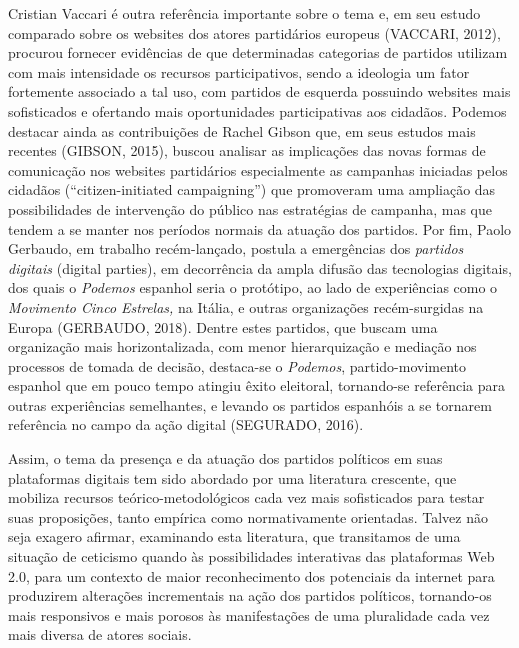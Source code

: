 Cristian Vaccari é outra referência importante sobre o tema e, em seu
estudo comparado sobre os websites dos atores partidários europeus
(VACCARI, 2012), procurou fornecer evidências de que determinadas
categorias de partidos utilizam com mais intensidade os recursos
participativos, sendo a ideologia um fator fortemente associado a tal
uso, com partidos de esquerda possuindo websites mais sofisticados e
ofertando mais oportunidades participativas aos cidadãos. Podemos
destacar ainda as contribuições de Rachel Gibson que, em seus estudos
mais recentes (GIBSON, 2015), buscou analisar as implicações das novas
formas de comunicação nos websites partidários especialmente as
campanhas iniciadas pelos cidadãos (``citizen-initiated campaigning'')
que promoveram uma ampliação das possibilidades de intervenção do
público nas estratégias de campanha, mas que tendem a se manter nos
períodos normais da atuação dos partidos. Por fim, Paolo Gerbaudo, em
trabalho recém-lançado, postula a emergências dos \emph{partidos
digitais} (digital parties), em decorrência da ampla difusão das
tecnologias digitais, dos quais o \emph{Podemos} espanhol seria o
protótipo, ao lado de experiências como o \emph{Movimento Cinco
Estrelas,} na Itália, e outras organizações recém-surgidas na Europa
(GERBAUDO, 2018). Dentre estes partidos, que buscam uma organização mais
horizontalizada, com menor hierarquização e mediação nos processos de
tomada de decisão, destaca-se o \emph{Podemos}, partido-movimento
espanhol que em pouco tempo atingiu êxito eleitoral, tornando-se
referência para outras experiências semelhantes, e levando os partidos
espanhóis a se tornarem referência no campo da ação digital (SEGURADO,
2016).

Assim, o tema da presença e da atuação dos partidos políticos em suas
plataformas digitais tem sido abordado por uma literatura crescente, que
mobiliza recursos teórico-metodológicos cada vez mais sofisticados para
testar suas proposições, tanto empírica como normativamente orientadas.
Talvez não seja exagero afirmar, examinando esta literatura, que
transitamos de uma situação de ceticismo quando às possibilidades
interativas das plataformas Web 2.0, para um contexto de maior
reconhecimento dos potenciais da internet para produzirem alterações
incrementais na ação dos partidos políticos, tornando-os mais
responsivos e mais porosos às manifestações de uma pluralidade cada vez
mais diversa de atores sociais.

